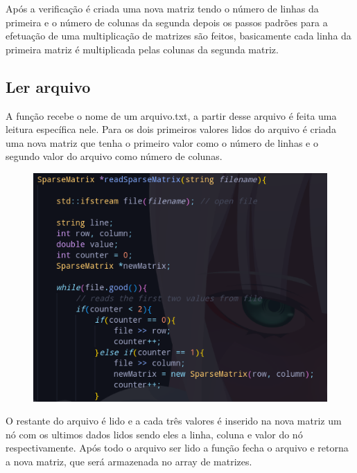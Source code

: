 \documentclass[a4paper,12pt]{article}
\begin{document}
Após a verificação é criada uma nova matriz tendo o número de linhas da primeira e o número de colunas da segunda depois os passos padrões para a efetuação de uma multiplicação de matrizes são feitos, basicamente cada linha da primeira matriz é multiplicada pelas colunas da segunda matriz.


\subsection{Ler arquivo}
A função recebe o nome de um arquivo.txt, a partir desse arquivo é feita uma leitura específica nele. Para os dois primeiros valores lidos do arquivo é criada uma nova matriz que tenha o primeiro valor como o número de linhas e o segundo valor do arquivo como número de colunas.

\begin{figure}[H]
\centering
\includegraphics[width=1\textwidth]{Imagens/main/read-sparsematrix-pt1.png}
\caption{\label{fig:readt}}
\end{figure}

O restante do arquivo é lido e a cada três valores é inserido na nova matriz um nó com os ultimos dados lidos sendo eles a linha, coluna e valor do nó respectivamente. Após todo o arquivo ser lido a função fecha o arquivo e retorna a nova matriz, que será armazenada no array de matrizes.
\end{document}
